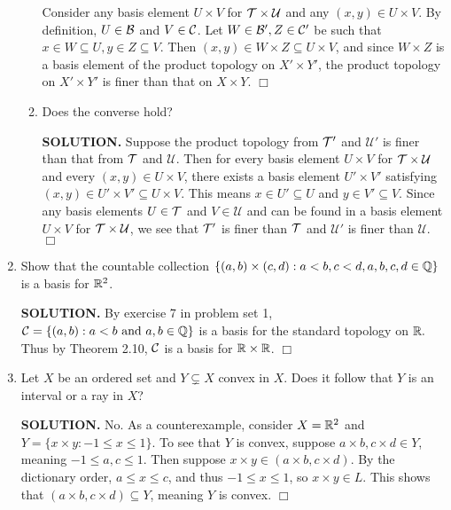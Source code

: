 \documentclass{article}
\begin{document}
\begin{enumerate}
\begin{enumerate}
        Consider any basis element $U \times V$ for $\mathcal{T} \times \mathcal{U}$ and any $(x, y) \in U \times V$. By definition, $U \in \mathcal{B}$ and $V \in \mathcal{C}$. Let $W \in \mathcal{B}', Z \in \mathcal{C}'$ be such that $x \in W \subseteq U, y \in Z \subseteq V$. Then $(x, y) \in W \times Z \subseteq U \times V$, and since $W \times Z$ is a basis element of the product topology on $X' \times Y'$, the product topology on $X' \times Y'$ is finer than that on $X \times Y.$ $\Box$ 
        
        \item Does the converse hold? 

        {\bf SOLUTION.} Suppose the product topology from $\mathcal{T}'$ and $\mathcal{U}'$ is finer than that from $\mathcal{T}$ and $\mathcal{U}$. Then for every basis element $U \times V$ for $\mathcal{T} \times \mathcal{U}$ and every $(x, y) \in U \times V$, there exists a basis element $U' \times V'$ satisfying $(x, y) \in U' \times V' \subseteq U \times V$. This means $x \in U' \subseteq U$ and $y \in V' \subseteq V$. Since any basis elements $U \in \mathcal{T}$ and $V \in \mathcal{U}$ and can be found in a basis element $U \times V$ for $\mathcal{T} \times \mathcal{U}$, we see that $\mathcal{T}'$ is finer than $\mathcal{T}$ and $\mathcal{U}'$ is finer than $\mathcal{U}.$ $\Box$ 

        \end{enumerate}

        \item Show that the countable collection $\{(a, b) \times (c, d) : a< b, c<d, a, b, c, d \in \mathbb{Q}\}$ is a basis for $\mathbb{R}^2$. 

        {\bf SOLUTION.} By exercise 7 in problem set 1, $\mathcal{C} = \{(a, b) : a< b \text{ and } a, b \in \mathbb{Q}\}$ is a basis for the standard topology on $\mathbb{R}.$ Thus by Theorem 2.10, $\mathcal{C}$ is a basis for $\mathbb{R} \times \mathbb{R}$. $\Box$ 

        \item Let $X$ be an ordered set and $Y \subsetneq X$ convex in $X$. Does it follow that $Y$ is an interval or a ray in $X$?

        {\bf SOLUTION.} No. As a counterexample, consider $X =\mathbb{R}^2$ and $Y = \{x \times y: -1 \leq x \leq 1\}$. To see that $Y$ is convex, suppose $a \times b, c \times d \in Y$, meaning $-1 \leq a, c \leq 1$. Then suppose $x \times y \in (a \times b, c \times d)$. By the dictionary order, $a \leq x \leq c$, and thus $-1 \leq x \leq 1$, so $x \times y \in L$. This shows that $(a \times b, c \times d) \subseteq Y$, meaning $Y$ is convex. $\Box$ 


\end{enumerate}
\end{document}

